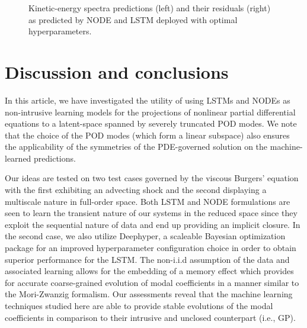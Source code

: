 \documentclass[preprint,12pt]{elsarticle}
\begin{document}
\begin{figure}
	\centering
	\caption{Kinetic-energy spectra predictions (left) and their residuals (right) as predicted by NODE and LSTM deployed with optimal hyperparameters.}
	\label{Figure18}
\end{figure}


\section{Discussion and conclusions}

In this article, we have investigated the utility of using LSTMs and NODEs as non-intrusive learning models for the projections of nonlinear partial differential equations to a latent-space spanned by severely truncated POD modes. We note that the choice of the POD modes (which form a linear subspace) also ensures the applicability of the symmetries of the PDE-governed solution on the machine-learned predictions.

Our ideas are tested on two test cases governed by the viscous Burgers' equation with the first exhibiting an advecting shock and the second displaying a multiscale nature in full-order space. Both LSTM and NODE formulations are seen to learn the transient nature of our systems in the reduced space since they exploit the sequential nature of data and end up providing an implicit closure. In the second case, we also utilize Deephyper, a scaleable Bayesian optimization package for an improved hyperparameter configuration choice in order to obtain superior performance for the LSTM. The non-i.i.d assumption of the data and associated learning allows for the embedding of a memory effect which provides for accurate coarse-grained evolution of modal coefficients in a manner similar to the Mori-Zwanzig formalism. Our assessments reveal that the machine learning techniques studied here are able to provide stable evolutions of the modal coefficients in comparison to their intrusive and unclosed counterpart (i.e., GP).
\end{document}
